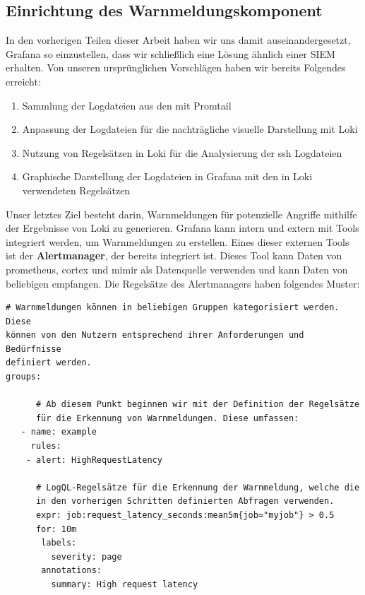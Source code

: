 \subsection{Einrichtung des Warnmeldungskomponent}
In den vorherigen Teilen dieser Arbeit haben wir uns damit auseinandergesetzt, Grafana so einzustellen, dass wir schließlich eine Lösung ähnlich einer \gls{SIEM} erhalten. Von unseren ursprünglichen Vorschlägen haben wir bereits Folgendes erreicht:

{
\begin{enumerate}[noitemsep]
   \item	Sammlung der Logdateien aus den  mit Promtail
   \item Anpassung der Logdateien für die nachträgliche visuelle Darstellung mit Loki
   \item Nutzung von Regelsätzen in Loki für die Analysierung der \gls{ssh} Logdateien
   \item Graphische Darstellung der Logdateien in Grafana mit den in Loki verwendeten Regelsätzen
\end{enumerate}
}
Unser letztes Ziel besteht darin, Warnmeldungen für potenzielle Angriffe mithilfe der Ergebnisse von Loki zu generieren. Grafana kann intern und extern mit Tools integriert werden, um Warnmeldungen zu erstellen. Eines dieser externen Tools ist der \textbf{Alertmanager}, der bereits integriert ist. Dieses Tool kann Daten von \gls{prometheus}, \gls{cortex} und \gls{mimir} als Datenquelle verwenden \citep{Grafana_Alertmanager} und kann Daten von beliebigen  empfangen. Die Regelsätze des Alertmanagers haben folgendes Muster:

{
\begin{Verbatim}[frame=single]
# Warnmeldungen können in beliebigen Gruppen kategorisiert werden. Diese
können von den Nutzern entsprechend ihrer Anforderungen und Bedürfnisse 
definiert werden.
groups:

      # Ab diesem Punkt beginnen wir mit der Definition der Regelsätze 
      für die Erkennung von Warnmeldungen. Diese umfassen:
   - name: example
     rules:
    - alert: HighRequestLatency

      # LogQL-Regelsätze für die Erkennung der Warnmeldung, welche die 
      in den vorherigen Schritten definierten Abfragen verwenden.
      expr: job:request_latency_seconds:mean5m{job="myjob"} > 0.5
      for: 10m
       labels:
         severity: page
       annotations:
         summary: High request latency
\end{Verbatim}
}

